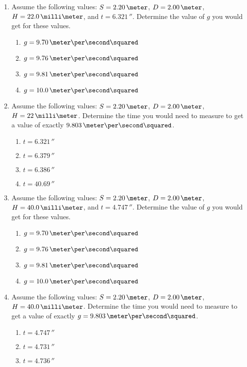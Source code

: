 \begin{enumerate}
\item Assume the following values: $S = 2.20\,\meter$,  $D = 2.00\,\meter$, $H = 22.0\,\milli\meter$, and $t = 6.321\,\second$.  Determine the value of $g$ you would get for these values.
  \begin{enumerate}
  \item $g = 9.70\,\meter\per\second\squared$
  \item $g = 9.76\,\meter\per\second\squared$
  \item $g = 9.81\,\meter\per\second\squared$
  \item $g = 10.0\,\meter\per\second\squared$
  \end{enumerate}
\item  Assume the following values: $S = 2.20\,\meter$,  $D = 2.00\,\meter$, $H = 22\,\milli\meter$.  Determine the time you would need to measure to get a value of exactly $9.803\,\meter\per\second\squared$.
  \begin{enumerate}
  \item $t = 6.321\,\second$
  \item $t = 6.379\,\second$
  \item $t = 6.386\,\second$
  \item $t = 40.69\,\second$
  \end{enumerate}
\item Assume the following values: $S = 2.20\,\meter$,  $D = 2.00\,\meter$, $H = 40.0\,\milli\meter$, and $t = 4.747\,\second$.  Determine the value of $g$ you would get for these values.
  \begin{enumerate}
  \item $g = 9.70\,\meter\per\second\squared$
  \item $g = 9.76\,\meter\per\second\squared$
  \item $g = 9.81\,\meter\per\second\squared$
  \item $g = 10.0\,\meter\per\second\squared$
  \end{enumerate}
\item  Assume the following values: $S = 2.20\,\meter$,  $D = 2.00\,\meter$, $H = 40.0\,\milli\meter$.  Determine the time you would need to measure to get a value of exactly $g = 9.803\,\meter\per\second\squared$.
  \begin{enumerate}
  \item $t = 4.747\,\second$
  \item $t = 4.731\,\second$
  \item $t = 4.736\,\second$

\end{enumerate}
\end{enumerate}
